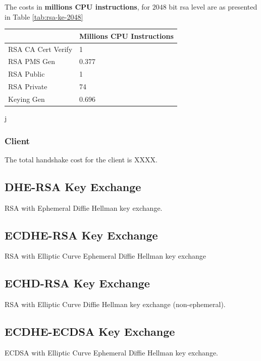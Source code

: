 \documentclass{llncs}
\begin{document}
The costs in \textbf{millions CPU instructions}, for $2048$ bit \gls{rsa} level are as
presented in Table \ref{tab:rsa-ke-2048}

\begin{table}[]
\begin{tabular}{|l|l|}
\hline
                   & Millions CPU Instructions \\ \hline
RSA CA Cert Verify & 1                         \\ \hline
RSA PMS Gen        & 0.377                     \\ \hline
RSA Public         & 1                         \\ \hline
RSA Private        & 74                        \\ \hline
Keying Gen         & 0.696                     \\ \hline
\end{tabular}
\end{table}j

\subsubsection{Client}

The total handshake cost for the client is XXXX.


\subsection{DHE-RSA Key Exchange}

RSA with Ephemeral Diffie Hellman key exchange.

\subsection{ECDHE-RSA Key Exchange}

RSA with Elliptic Curve Ephemeral Diffie Hellman key exchange

\subsection{ECHD-RSA Key Exchange}

RSA with Elliptic Curve Diffie Hellman key exchange (non-ephemeral).

\subsection{ECDHE-ECDSA Key Exchange}

ECDSA with Elliptic Curve Ephemeral Diffie Hellman key exchange.
\end{document}
